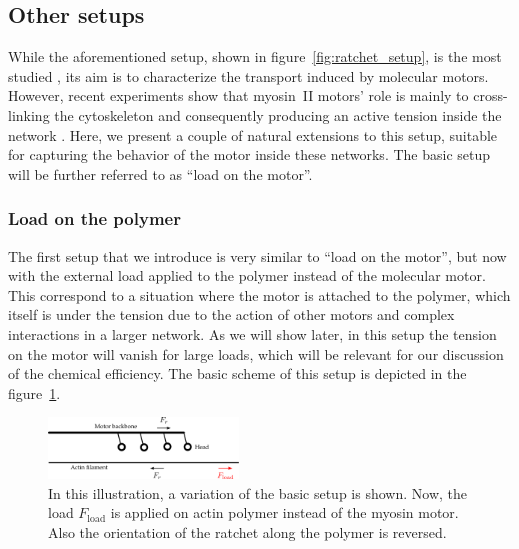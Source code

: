 \documentclass[aps,pre,twocolumn,showpacs,showkeys,superscriptaddress,floatfix]{revtex4-1}
\begin{document}
\subsection{Other setups}
\label{sec:other_setups}
While the aforementioned setup, shown in figure~\ref{fig:ratchet_setup}, is the most studied \cite{reimann2002brownian,astumian1994fluctuation,finer1994single,julicher1997modeling,kishino1988force,peskin1995correlation,saito1994movement},
its aim is to characterize the transport induced by molecular motors.
However, recent experiments show that myosin~II motors' role is mainly to cross-linking the cytoskeleton 
and consequently producing an active tension inside the network \cite{ma2012nonmuscle}.
Here, we present a couple of natural extensions to this setup, suitable for capturing the behavior of the motor inside these networks.
The basic setup will be further referred to as ``load on the motor''.

\subsubsection{Load on the polymer}
\label{sec:load_on_polymer}
The first setup that we introduce is very similar to ``load on the motor'', 
but now with the external load applied to the polymer instead of the molecular motor. 
This correspond to a situation where the motor is attached to the polymer, which itself is under the tension due to the action of other motors and complex interactions in a larger network.
As we will show later, in this setup the tension on the motor will vanish for large loads, which will be relevant for our discussion of the chemical efficiency. 
The basic scheme of this setup is depicted in the figure~\ref{fig:load_on_polymer setup}.
\begin{figure}[t]
\centering
\includegraphics[width=0.45\textwidth,height=!]{load_on_polymer_illustration}
\caption{
\label{fig:load_on_polymer setup}
In this illustration, a variation of the basic setup is shown.  
Now, the load $F_\text{load}$ is applied on actin polymer instead of the myosin motor. Also the orientation of the ratchet along the polymer is reversed.
} 
\end{figure}
\end{document}
